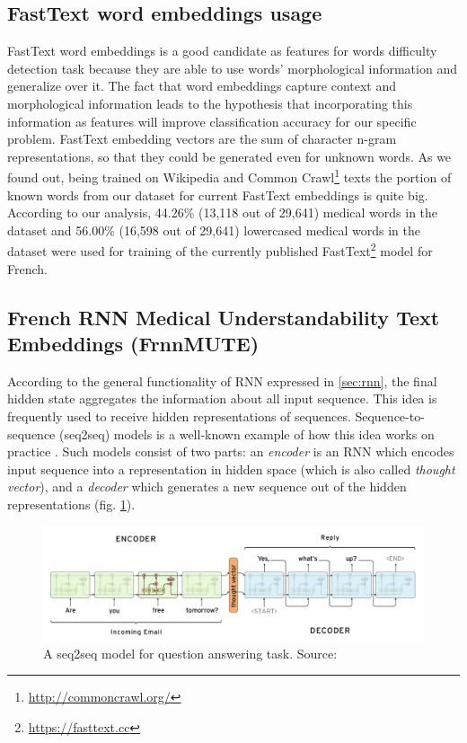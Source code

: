 \subsection{FastText word embeddings usage}

FastText word embeddings \cite{Bojanowski-ACL2017} is a good candidate as features for words difficulty detection task because they are able to use words' morphological information and generalize over it. The fact that word embeddings capture context and morphological information leads to the hypothesis that incorporating this information as features will improve classification accuracy for our specific problem. FastText embedding vectors are the sum of character n-gram representations, so that they could be generated even for unknown words. As we found out, being trained on Wikipedia and Common Crawl\footnote{\url{http://commoncrawl.org/}} texts the portion of known words from our dataset for current FastText embeddings is quite big. According to our analysis, 44.26\% (13,118 out of 29,641) medical words in the dataset and 56.00\% (16,598 out of 29,641) lowercased medical words in the dataset were used for training of the currently published FastText\footnote{\url{https://fasttext.cc}} model for French.

\subsection{French RNN Medical Understandability Text Embeddings (FrnnMUTE)}
\label{sec:frnnmute-learning}

According to the general functionality of RNN expressed in \ref{sec:rnn}, the final hidden state aggregates the information about all input sequence. This idea is frequently used to receive hidden representations of sequences. Sequence-to-sequence (seq2seq) models is a well-known example of how this idea works on practice \citep{Sutskever-NIPS2014}. Such models consist of two parts: an \textit{encoder} is an RNN which encodes input sequence into a representation in hidden space (which is also called \textit{thought vector}), and a \textit{decoder} which generates a new sequence out of the hidden representations (fig. \ref{fig:seq2seq}). 

\begin{figure}[h]
    \centering
    \includegraphics[width=14cm]{Images/seq2seq.png}
    \caption{A seq2seq model for question answering task. Source: \citep{Britz-2016}}
    \label{fig:seq2seq}
\end{figure} 

